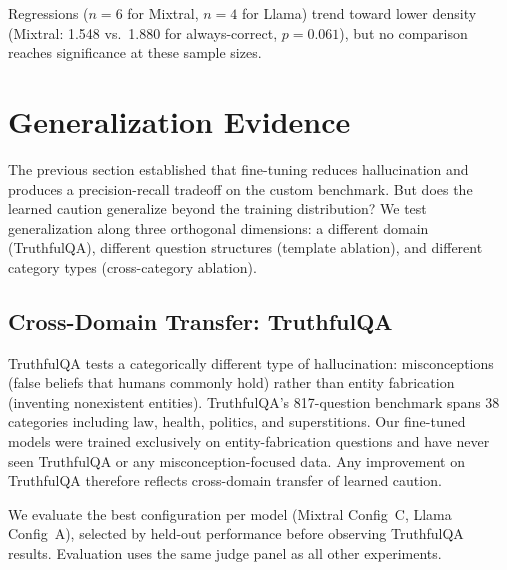 Regressions ($n = 6$ for Mixtral, $n = 4$ for Llama) trend toward lower density (Mixtral: 1.548 vs.\ 1.880 for always-correct, $p = 0.061$), but no comparison reaches significance at these sample sizes.


\section{Generalization Evidence}
\label{sec:generalization}

The previous section established that fine-tuning reduces hallucination and produces a precision-recall tradeoff on the custom benchmark. But does the learned caution generalize beyond the training distribution? We test generalization along three orthogonal dimensions: a different domain (TruthfulQA), different question structures (template ablation), and different category types (cross-category ablation). 
\subsection{Cross-Domain Transfer: TruthfulQA}
\label{sec:truthfulqa}

TruthfulQA \citep{lin2022truthfulqa} tests a categorically different type of hallucination: misconceptions (false beliefs that humans commonly hold) rather than entity fabrication (inventing nonexistent entities). TruthfulQA's 817-question benchmark spans 38 categories including law, health, politics, and superstitions. Our fine-tuned models were trained exclusively on entity-fabrication questions and have never seen TruthfulQA or any misconception-focused data. Any improvement on TruthfulQA therefore reflects cross-domain transfer of learned caution.

We evaluate the best configuration per model (Mixtral Config~C, Llama Config~A), selected by held-out performance before observing TruthfulQA results. Evaluation uses the same judge panel as all other experiments.

